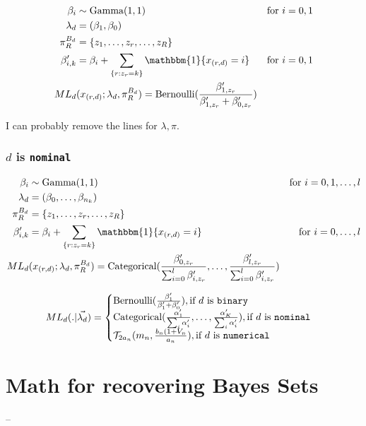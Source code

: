 \documentclass{article}
\newcommand{\set}[1]{\{{#1}\}}
\begin{document}
\begin{align*}
  \beta_i &\sim \text{Gamma}(1,1) & \text{for } i=0,1 \\
  \lambda_d &= (\beta_1, \beta_0) & \\
  \pi_R^{B_d} &= \set{z_1, \ldots, z_r,\ldots, z_R} & \\
  \beta'_{i,k} &= \beta_i + \sum_{\set{r: z_r=k}}\mathbbm{1}\set{x_{(r,d)}=i} 
                                  & \text{for } i=0,1 \\
  ML_d&(x_{(r,d)}; \lambda_d, \pi_R^{B_d}) = \text{Bernoulli}(\frac{\beta'_{1,z_r}}{\beta'_{1,z_r}+\beta_{0,z_r}'}) &  
\end{align*}

I can probably remove the lines for $\lambda, \pi$.

\subsubsection{$d$ is \texttt{nominal}}

\begin{align*}
  \beta_i &\sim \text{Gamma}(1,1) & \text{for } i=0,1,\ldots, l \\
  \lambda_d &= (\beta_0, \ldots, \beta_{n_k}) & \\
  \pi_R^{B_d} &= \set{z_1, \ldots, z_r,\ldots, z_R} & \\
  \beta'_{i,k} &= \beta_i + \sum_{\set{r: z_r=k}}\mathbbm{1}\set{x_{(r,d)}=i} 
                                  & \text{for } i=0,\ldots, l \\
  ML_d&(x_{(r,d)}; \lambda_d, \pi_R^{B_d}) = \text{Categorical}
        (\frac{\beta'_{0,z_r}}{\sum_{i=0}^{l} \beta'_{i,z_r}},\ldots, 
        \frac{\beta'_{l,z_r}}{\sum_{i=0}^{l} \beta'_{i,z_r}}) &  
\end{align*}

\begin{align*}
  ML_d(.|\vec{\lambda_d}) = 
    \begin{cases}
    \text{Bernoulli}(\frac{\beta_1'}{\beta_1'+\beta_0'}) 
      , \text{if } d \text{ is \texttt{binary}}\\
    \text{Categorical}(\frac{\alpha_1'}{\sum_i\alpha_i'},\ldots, 
      \frac{\alpha_K'}{\sum_i\alpha_i'})
      , \text{if } d \text{ is \texttt{nominal}}\\
    \mathcal{T}_{2a_n}(m_n, \frac{b_n(1+V_n}{a_n}), \text{if } d \text{ is \texttt{numerical}}\\
    \end{cases}
\end{align*}

\section{Math for recovering Bayes Sets}
--
\end{document}
